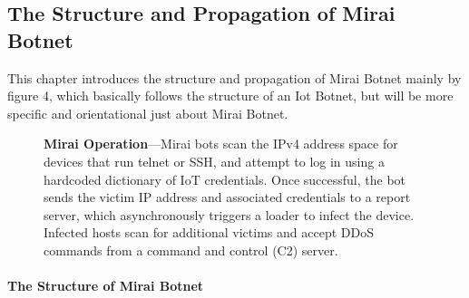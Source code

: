 \documentclass[conference]{IEEEtran}
\begin{document}
\subsection{\textbf{The Structure and Propagation of Mirai Botnet}}
This chapter introduces the structure and propagation of Mirai Botnet mainly by figure 4\cite{b1}, which basically follows the structure of an Iot Botnet, but will be more specific and orientational just about Mirai Botnet.

\begin{figure}[htbp]
\caption{\textbf{Mirai Operation}—Mirai bots scan the IPv4 address
space for devices that run telnet or SSH, and attempt to log in using
a hardcoded dictionary of IoT credentials. Once successful,
the bot sends the victim IP address and associated credentials to
a report server, which asynchronously triggers a loader to infect
the device. Infected hosts scan for additional victims and accept
DDoS commands from a command and control (C2) server.\cite{b1}}
\label{fig}
\end{figure}

\paragraph{\textbf{The Structure  of Mirai Botnet}}\\
\end{document}
